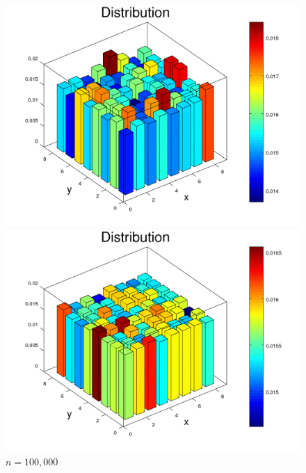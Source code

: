 \documentclass{amsart}
\numberwithin{equation}{section}
\begin{document}
\begin{figure}[!h]
\begin{minipage}{0.50\textwidth}
     \centering
     \includegraphics[width=1.0\linewidth]{figures/regular/figure_Rook_path_n10000.png}
     \captionsetup{labelformat=empty}
     \caption*{$n=10,000$}
    \end{minipage}\hfil
    \begin{minipage}{0.50\textwidth}
     \centering
     \includegraphics[width=1.0\linewidth]{figures/regular/figure_Rook_path_n100000.png}
     \captionsetup{labelformat=empty}
     \caption*{$n=100,000$}
   \end{minipage}\hfill
   \begin{minipage}{0.50\textwidth}
     \centering

\end{minipage}
\end{figure}
\end{document}

